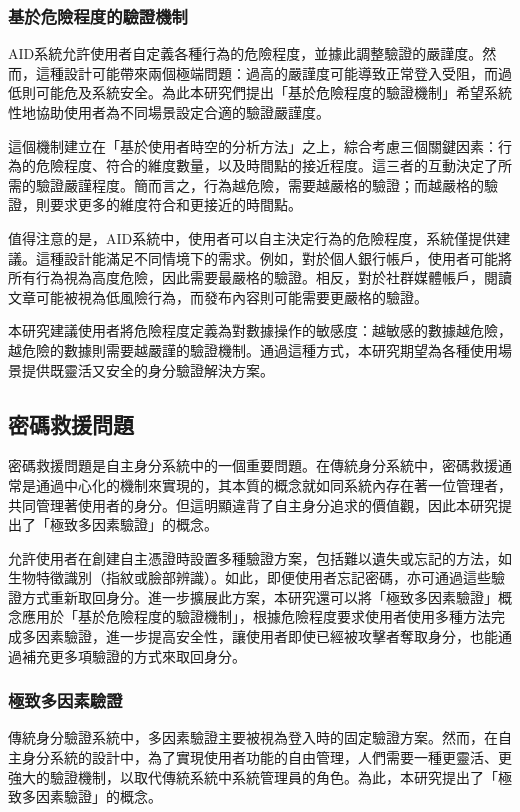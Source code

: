 \subsubsection{基於危險程度的驗證機制}
AID系統允許使用者自定義各種行為的危險程度，並據此調整驗證的嚴謹度。然而，這種設計可能帶來兩個極端問題：過高的嚴謹度可能導致正常登入受阻，而過低則可能危及系統安全。為此本研究們提出「基於危險程度的驗證機制」希望系統性地協助使用者為不同場景設定合適的驗證嚴謹度。

這個機制建立在「基於使用者時空的分析方法」之上，綜合考慮三個關鍵因素：行為的危險程度、符合的維度數量，以及時間點的接近程度。這三者的互動決定了所需的驗證嚴謹程度。簡而言之，行為越危險，需要越嚴格的驗證；而越嚴格的驗證，則要求更多的維度符合和更接近的時間點。

值得注意的是，AID系統中，使用者可以自主決定行為的危險程度，系統僅提供建議。這種設計能滿足不同情境下的需求。例如，對於個人銀行帳戶，使用者可能將所有行為視為高度危險，因此需要最嚴格的驗證。相反，對於社群媒體帳戶，閱讀文章可能被視為低風險行為，而發布內容則可能需要更嚴格的驗證。

本研究建議使用者將危險程度定義為對數據操作的敏感度：越敏感的數據越危險，越危險的數據則需要越嚴謹的驗證機制。通過這種方式，本研究期望為各種使用場景提供既靈活又安全的身分驗證解決方案。
\subsection{密碼救援問題}
密碼救援問題是自主身分系統中的一個重要問題。在傳統身分系統中，密碼救援通常是通過中心化的機制來實現的，其本質的概念就如同系統內存在著一位管理者，共同管理著使用者的身分。但這明顯違背了自主身分追求的價值觀，因此本研究提出了「極致多因素驗證」的概念。

允許使用者在創建自主憑證時設置多種驗證方案，包括難以遺失或忘記的方法，如生物特徵識別（指紋或臉部辨識）。如此，即便使用者忘記密碼，亦可通過這些驗證方式重新取回身分。進一步擴展此方案，本研究還可以將「極致多因素驗證」概念應用於「基於危險程度的驗證機制」，根據危險程度要求使用者使用多種方法完成多因素驗證，進一步提高安全性，讓使用者即使已經被攻擊者奪取身分，也能通過補充更多項驗證的方式來取回身分。
\subsubsection{極致多因素驗證}
傳統身分驗證系統中，多因素驗證主要被視為登入時的固定驗證方案。然而，在自主身分系統的設計中，為了實現使用者功能的自由管理，人們需要一種更靈活、更強大的驗證機制，以取代傳統系統中系統管理員的角色。為此，本研究提出了「極致多因素驗證」的概念。

